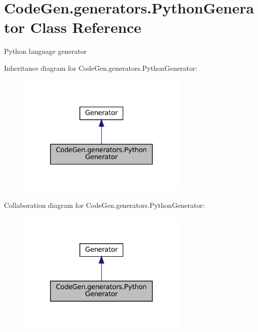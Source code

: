 \hypertarget{classCodeGen_1_1generators_1_1PythonGenerator}{}\section{Code\+Gen.\+generators.\+Python\+Generator Class Reference}
\label{classCodeGen_1_1generators_1_1PythonGenerator}


Python language generator  




Inheritance diagram for Code\+Gen.\+generators.\+Python\+Generator\+:
\nopagebreak
\begin{figure}[H]
\begin{center}
\leavevmode
\includegraphics[width=233pt]{classCodeGen_1_1generators_1_1PythonGenerator__inherit__graph}
\end{center}
\end{figure}


Collaboration diagram for Code\+Gen.\+generators.\+Python\+Generator\+:
\nopagebreak
\begin{figure}[H]
\begin{center}
\leavevmode
\includegraphics[width=233pt]{classCodeGen_1_1generators_1_1PythonGenerator__coll__graph}
\end{center}
\end{figure}
